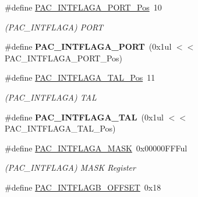 \begin{DoxyCompactItemize}
\item 
\hypertarget{group___s_a_m_l21___p_a_c_ga8234d1e5ad233c03640830a88f311c89}{}\#define \hyperlink{group___s_a_m_l21___p_a_c_ga8234d1e5ad233c03640830a88f311c89}{P\+A\+C\+\_\+\+I\+N\+T\+F\+L\+A\+G\+A\+\_\+\+P\+O\+R\+T\+\_\+\+Pos}~10\label{group___s_a_m_l21___p_a_c_ga8234d1e5ad233c03640830a88f311c89}

\begin{DoxyCompactList}\small\item\em (P\+A\+C\+\_\+\+I\+N\+T\+F\+L\+A\+G\+A) P\+O\+R\+T \end{DoxyCompactList}\item 
\hypertarget{group___s_a_m_l21___p_a_c_ga41a1d451a588af9611d3bbf9c026de65}{}\#define {\bfseries P\+A\+C\+\_\+\+I\+N\+T\+F\+L\+A\+G\+A\+\_\+\+P\+O\+R\+T}~(0x1ul $<$$<$ P\+A\+C\+\_\+\+I\+N\+T\+F\+L\+A\+G\+A\+\_\+\+P\+O\+R\+T\+\_\+\+Pos)\label{group___s_a_m_l21___p_a_c_ga41a1d451a588af9611d3bbf9c026de65}

\item 
\hypertarget{group___s_a_m_l21___p_a_c_gaf746fe7b494502af5cefc153b966f457}{}\#define \hyperlink{group___s_a_m_l21___p_a_c_gaf746fe7b494502af5cefc153b966f457}{P\+A\+C\+\_\+\+I\+N\+T\+F\+L\+A\+G\+A\+\_\+\+T\+A\+L\+\_\+\+Pos}~11\label{group___s_a_m_l21___p_a_c_gaf746fe7b494502af5cefc153b966f457}

\begin{DoxyCompactList}\small\item\em (P\+A\+C\+\_\+\+I\+N\+T\+F\+L\+A\+G\+A) T\+A\+L \end{DoxyCompactList}\item 
\hypertarget{group___s_a_m_l21___p_a_c_ga6e854453c06c3f98c86ef18ea3590233}{}\#define {\bfseries P\+A\+C\+\_\+\+I\+N\+T\+F\+L\+A\+G\+A\+\_\+\+T\+A\+L}~(0x1ul $<$$<$ P\+A\+C\+\_\+\+I\+N\+T\+F\+L\+A\+G\+A\+\_\+\+T\+A\+L\+\_\+\+Pos)\label{group___s_a_m_l21___p_a_c_ga6e854453c06c3f98c86ef18ea3590233}

\item 
\hypertarget{group___s_a_m_l21___p_a_c_gacb516faf4eff811311d1d179213ff279}{}\#define \hyperlink{group___s_a_m_l21___p_a_c_gacb516faf4eff811311d1d179213ff279}{P\+A\+C\+\_\+\+I\+N\+T\+F\+L\+A\+G\+A\+\_\+\+M\+A\+S\+K}~0x00000\+F\+F\+Ful\label{group___s_a_m_l21___p_a_c_gacb516faf4eff811311d1d179213ff279}

\begin{DoxyCompactList}\small\item\em (P\+A\+C\+\_\+\+I\+N\+T\+F\+L\+A\+G\+A) M\+A\+S\+K Register \end{DoxyCompactList}\item 
\hypertarget{group___s_a_m_l21___p_a_c_ga008f186584878920c54459ef777fa7cf}{}\#define \hyperlink{group___s_a_m_l21___p_a_c_ga008f186584878920c54459ef777fa7cf}{P\+A\+C\+\_\+\+I\+N\+T\+F\+L\+A\+G\+B\+\_\+\+O\+F\+F\+S\+E\+T}~0x18\label{group___s_a_m_l21___p_a_c_ga008f186584878920c54459ef777fa7cf}


\end{DoxyCompactItemize}
